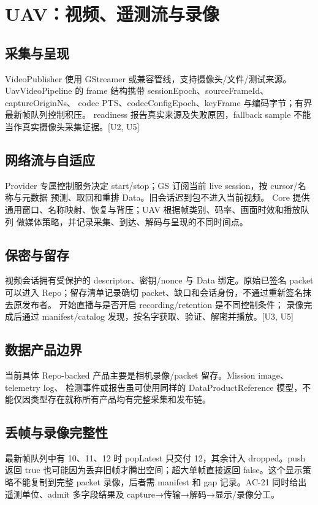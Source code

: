 \newpage

\section{UAV：视频、遥测流与录像}
\subsection{采集与呈现}
VideoPublisher 使用 GStreamer 或兼容管线，支持摄像头/文件/测试来源。
UavVideoPipeline 的 frame 结构携带 sessionEpoch、sourceFrameId、captureOriginNs、
codec PTS、codecConfigEpoch、keyFrame 与编码字节；有界最新帧队列控制积压。
readiness 报告真实来源及失败原因，fallback sample 不能当作真实摄像头采集证据。[U2, U5]

\subsection{网络流与自适应}
Provider 专属控制服务决定 start/stop；GS 订阅当前 live session，按 cursor/名称与元数据
预测、取回和重排 Data。旧会话迟到包不进入当前视频。
Core 提供通用窗口、名称映射、恢复与背压；UAV 根据帧类别、码率、画面时效和播放队列
做媒体策略，并记录采集、到达、解码与呈现的不同时间点。

\subsection{保密与留存}
视频会话拥有受保护的 descriptor、密钥/nonce 与 Data 绑定。原始已签名 packet 可以进入
Repo；留存清单记录确切 packet、缺口和会话身份，不通过重新签名抹去原发布者。
开始直播与是否开启 recording/retention 是不同控制条件；
录像完成后通过 manifest/catalog 发现，按名字获取、验证、解密并播放。[U3, U5]

\subsection{数据产品边界}
当前具体 Repo-backed 产品主要是相机录像/packet 留存。Mission image、telemetry log、
检测事件或报告虽可使用同样的 DataProductReference 模型，不能仅因类型存在就称所有产品均有完整采集和发布链。



\subsection{丢帧与录像完整性}
最新帧队列中有 10、11、12 时 popLatest 只交付 12，其余计入 dropped。push 返回 true 也可能因为丢弃旧帧才腾出空间；超大单帧直接返回 false。这个显示策略不能复制到完整 packet 录像，后者需 manifest 和 gap 记录。AC-21 同时给出遥测单位、admit 多字段结果及 capture→传输→解码→显示/录像分工。

